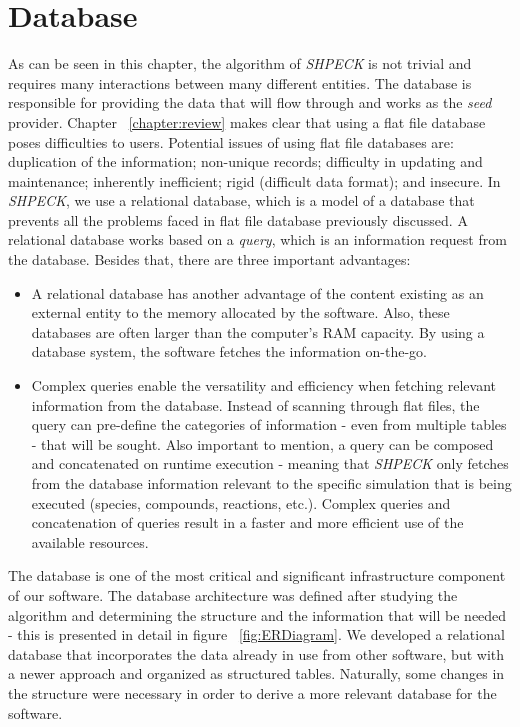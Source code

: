 \section{Database}
As can be seen in this chapter, the algorithm of \emph{SHPECK} is not trivial and requires many interactions between many different entities. The database is responsible for providing the data that will flow through and works as the \emph{seed} provider. Chapter ~\ref{chapter:review} makes clear that using a flat file database poses difficulties to users. Potential issues of using flat file databases are: duplication of the information; non-unique records; difficulty in updating and maintenance; inherently inefficient; rigid (difficult data format); and insecure.
In \emph{SHPECK}, we use a relational database, which is a model of a database that prevents all the problems faced in flat file database previously discussed. A relational database works based on a \emph{query}, which is an information request from the database. Besides that, there are three important advantages:
\begin{itemize}
\item A relational database has another advantage of the content existing as an external entity to the memory allocated by the software. Also, these databases are often larger than the computer's RAM capacity. By using a database system, the software fetches the information on-the-go. 
\item Complex queries enable the versatility and efficiency when fetching relevant information from the database. Instead of scanning through flat files, the query can pre-define the categories of information - even from multiple tables - that will be sought. Also important to mention, a query can be composed and concatenated on runtime execution - meaning that \emph{SHPECK} only fetches from the database information relevant to the specific simulation that is being executed (species, compounds, reactions, etc.). Complex queries and concatenation of queries result in a faster and more efficient use of the available resources.
\end{itemize}

The database is one of the most critical and significant infrastructure component of our software. The database architecture was defined after studying the algorithm and determining the structure and the information that will be needed - this is presented in detail in figure ~\ref{fig:ERDiagram}. We developed a relational database that incorporates the data already in use from other software, but with a newer approach and organized as structured tables. Naturally, some changes in the structure were necessary in order to derive a more relevant database for the software.

